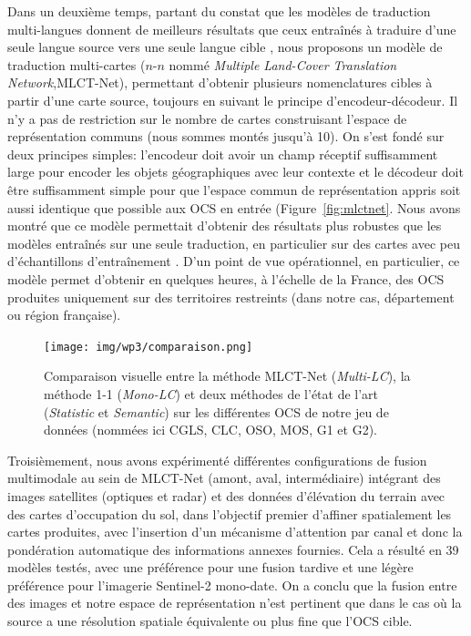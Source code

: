 Dans un deuxième temps, partant du constat que les modèles de traduction multi-langues donnent de meilleurs résultats que ceux entraînés à traduire d'une seule langue source vers une seule langue cible \cite{Pires2019}, nous proposons un modèle de traduction multi-cartes ($n$-$n$ nommé  \textit{Multiple Land-Cover Translation Network},MLCT-Net), permettant d'obtenir plusieurs nomenclatures cibles à partir d'une carte source, toujours en suivant le principe d'encodeur-décodeur. Il n'y a pas de restriction sur le nombre de cartes construisant l'espace de représentation communs (nous sommes montés jusqu'à 10). On s'est fondé sur deux principes simples: l'encodeur doit avoir un champ réceptif suffisamment large pour encoder les objets géographiques avec leur contexte et le décodeur doit être suffisamment simple pour que l'espace commun de représentation appris soit aussi identique que possible aux OCS en entrée (Figure~\ref{fig:mlctnet}.
Nous avons montré que ce modèle permettait d'obtenir des résultats plus robustes que les modèles entraînés sur une seule traduction, en particulier sur des cartes avec peu d'échantillons d'entraînement \cite{Luc_IGARSS22} \cite{luc_ijgis}. D'un point de vue opérationnel, en particulier, ce modèle permet d'obtenir en quelques heures, à l'échelle de la France, des OCS produites uniquement sur des territoires restreints (dans notre cas, département ou région française).\\
  \begin{figure}[htbp]
        \centering
        \texttt{[image: img/wp3/comparaison.png]}
        \caption{Comparaison visuelle entre la méthode MLCT-Net (\textit{Multi-LC}), la méthode 1-1 (\textit{Mono-LC}) et deux méthodes de l'état de l'art (\textit{Statistic} et \textit{Semantic}) sur les différentes OCS de notre jeu de données (nommées ici CGLS, CLC, OSO, MOS, G1 et G2).\label{fig:comparison}}
        \end{figure}
Troisièmement, nous avons expérimenté différentes configurations de fusion multimodale au sein de MLCT-Net (amont, aval, intermédiaire) intégrant des images satellites (optiques et radar) et des données d'élévation du terrain avec des cartes d'occupation du sol, dans l'objectif premier d'affiner spatialement les cartes produites, avec l'insertion d'un mécanisme d'attention par canal et donc la pondération automatique des informations annexes fournies. Cela a résulté en 39 modèles testés, avec une préférence pour une fusion tardive et une légère préférence pour l'imagerie Sentinel-2 mono-date. On a conclu que la fusion entre des images et notre espace de représentation n'est pertinent que dans le cas où la source a une résolution spatiale équivalente ou plus fine que l'OCS cible.\\

